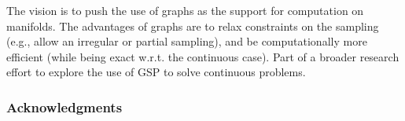 \documentclass{article} %
\newcommand{\1}{\b{1}}              %
\newcommand{\0}{\b{0}}              %
\newcommand{\todo}[1]{{\color[rgb]{.6,.1,.6}{#1}}}
\begin{document}
\todo{Similar goal: graph CNNs for group equivariant convolution.}

The vision is to push the use of graphs as the support for computation on manifolds. The advantages of graphs are to relax constraints on the sampling (e.g., allow an irregular or partial sampling), and be computationally more efficient (while being exact w.r.t. the continuous case).
Part of a broader research effort to explore the use of GSP to solve continuous problems.

\subsubsection*{Acknowledgments}

\todo{Pierre, Cardoso, Tomek?}



\end{document}
